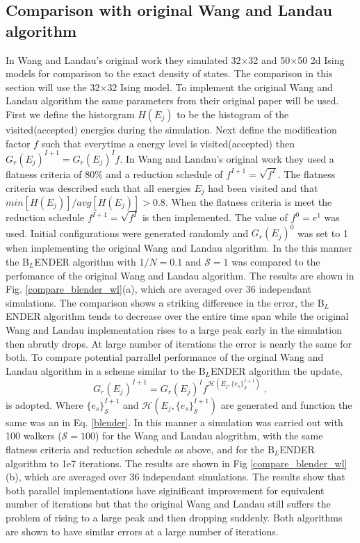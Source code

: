 \documentclass[aps,pre,reprint,superscriptaddress,showkeys]{revtex4-1}
\begin{document}
\subsection{Comparison with original Wang and Landau algorithm}
In Wang and Landau's original work they simulated  32$\times$32 and 50$\times$50 2d Ising models for comparison to the exact density of states. The comparison in this section will use the 32$\times$32 Ising model. To implement the original Wang and Landau algorithm the same parameters from their original paper will be used\cite{WL_phys_rev_lett}. First we define the historgram $H(E_j)$ to be the histogram of the visited(accepted) energies during the simulation. Next define the modification factor $f$ such that everytime a energy level is visited(accepted) then $G_r(E_j)^{I+1} = G_r(E_j)^{I}f$. In Wang and Landau's original work they used a flatness criteria of $80\%$ and a reduction schedule of $f^{I+1}= \sqrt{f^{I}}$. The flatness criteria was described such that all energies $E_j$ had been visited and that  $min[H(E_j)]/avg[H(E_j)] > 0.8$. When the flatness criteria is meet the reduction schedule $f^{I+1}= \sqrt{f^{I}}$ is then implemented. The value of $f^0 = e^1$ was used. Initial configurations were generated randomly and $G_r(E_j)^0$ was set to 1 when implementing the original Wang and Landau algorithm.  In the this manner the B$_L$ENDER algorithm with $1/N = 0.1$ and $\mathcal{S}=1$ was compared to the perfomance of the original Wang and Landau algorithm. The results are shown in Fig. \ref{compare_blender_wl}(a), which are averaged over 36 independant simulations. The comparison shows a striking difference in the error,  the B$_L$ENDER algorithm  tends to decrease over the entire time span while the original Wang and Landau implementation  rises to a large peak early in the simulation then abrutly drops. At large number of iterations the error is nearly the same for both. To compare potential parrallel performance of the orginal Wang and Landau algorithm in a scheme similar to the B$_L$ENDER algorithm the update,
\begin{equation}
G_r(E_j)^{I+1} = G_r(E_j)^{I}f^{\mathcal{H}(E_j,\{e_s\}^{I+1}_{\mathcal{S}})}\;,
\label{parallelscheme}
\end{equation}
is adopted. Where $\{e_s\}^{I+1}_{\mathcal{S}}$ and $\mathcal{H}(E_j,\{e_s\}^{I+1}_{\mathcal{S}})$ are generated and function the same was an in Eq. \ref{blender}. In this manner a simulation was carried out with 100 walkers ($\mathcal{S}=100$) for the Wang and Landau alogrithm, with the same flatness criteria and reduction schedule as above, and for the B$_L$ENDER algorithm to 1e7 iterations. The results are shown in Fig \ref{compare_blender_wl}(b), which are averaged over 36 independant simulations. The results show that both parallel implementations have siginificant improvement for equivalent number of iterations but that the original Wang and Landau still suffers the problem of rising to a large peak and then dropping suddenly. Both algorithms are shown to have similar errors at a large number of iterations. 
\end{document}

